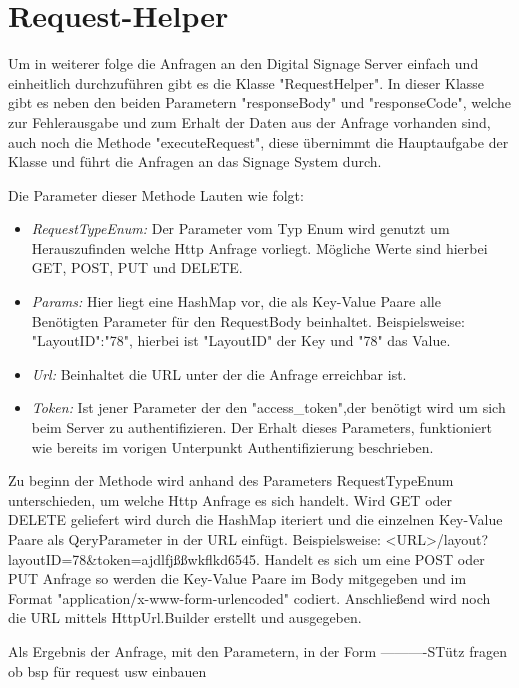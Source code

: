 \section{Request-Helper}
Um in weiterer folge die Anfragen an den Digital Signage Server einfach und einheitlich durchzuführen gibt es die Klasse "RequestHelper". In dieser Klasse gibt es neben den beiden Parametern "responseBody" und "responseCode", welche zur Fehlerausgabe und zum Erhalt der Daten aus der Anfrage vorhanden sind, auch noch die Methode "executeRequest", diese übernimmt die Hauptaufgabe der Klasse und führt die Anfragen an das Signage System durch.

Die Parameter dieser Methode Lauten wie folgt:

\begin{itemize}
	\item {\em RequestTypeEnum:} Der Parameter vom Typ Enum wird genutzt um Herauszufinden welche Http Anfrage vorliegt. Mögliche Werte sind hierbei GET, POST, PUT und DELETE.
	
	\item {\em Params:} Hier liegt eine HashMap vor, die als Key-Value Paare alle Benötigten Parameter für den RequestBody beinhaltet. Beispielsweise: "LayoutID":"78", hierbei ist "LayoutID" der Key und "78" das Value.
		
	\item {\em Url:} Beinhaltet die URL unter der die Anfrage erreichbar ist. 
	
	\item {\em Token:} Ist jener Parameter der den "access_token",der benötigt wird um sich beim Server zu authentifizieren. Der Erhalt dieses Parameters, funktioniert wie bereits im vorigen Unterpunkt Authentifizierung beschrieben.
	
\end{itemize}

Zu beginn der Methode wird anhand des Parameters RequestTypeEnum unterschieden, um welche Http Anfrage es sich handelt. Wird GET oder DELETE geliefert wird durch die HashMap iteriert und die einzelnen Key-Value Paare als QeryParameter in der URL einfügt. Beispielsweise: <URL>/layout?layoutID=78&token=ajdlfjßßwkflkd6545.
Handelt es sich um eine POST oder PUT Anfrage so werden die Key-Value Paare im Body mitgegeben und im Format "application/x-www-form-urlencoded" codiert. Anschließend wird noch die URL mittels HttpUrl.Builder erstellt und ausgegeben. 




Als Ergebnis der Anfrage, mit den Parametern, in der Form
----------STütz fragen ob bsp für request usw einbauen



